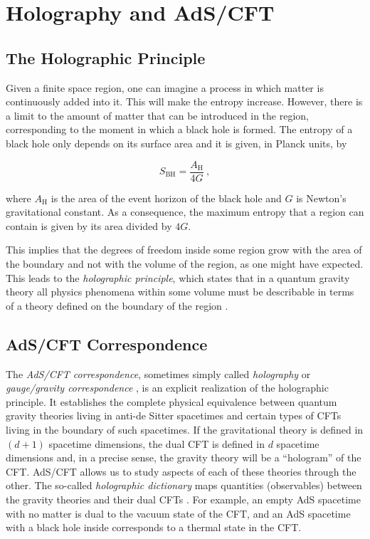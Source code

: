 \documentclass[twocolumn]{revtex4-2}
\providecommand{\eq}[2]{
    \begin{equation}
        #2
    \label{eq:#1}
    \end{equation}
}
\begin{document}
\section{Holography and AdS/CFT} \label{s:Holo_AdS/CFT}


\subsection{The Holographic Principle} \label{ss:Holography}

Given a finite space region, one can imagine a process in which matter is continuously added into it. This will make the entropy increase. However, there is a limit to the amount of matter that can be introduced in the region, corresponding to the moment in which a black hole is formed. The entropy of a black hole only depends on its surface area and it is given, in Planck units, by \cite{bekenstein_black_1973, hawking_particle_1975}
\eq{BH}{
    S_\text{BH} = \frac{ A_\text{H} }{ 4 G } \ ,
}
where $A_\text{H}$ is the area of the event horizon of the black hole and $G$ is Newton's gravitational constant. As a consequence, the maximum entropy that a region can contain is given by its area divided by $4G$.

This implies that the degrees of freedom inside some region grow with the area of the boundary and not with the volume of the region, as one might have expected. This leads to the \emph{holographic principle}, which states that in a quantum gravity theory all physics phenomena within some volume must be describable in terms of a theory defined on the boundary of the region \cite{t_hooft_dimensional_2009}.


\subsection{AdS/CFT Correspondence} \label{ss:AdS/CFT}

The \emph{AdS/CFT correspondence}, sometimes simply called \emph{holography} or \emph{gauge/gravity correspondence} \cite{maldacena_large_1999}, is an explicit realization of the holographic principle. It establishes the complete physical equivalence between quantum gravity theories living in anti-de Sitter spacetimes and certain types of CFTs living in the boundary of such spacetimes. If the gravitational theory is defined in $(d+1)$ spacetime dimensions, the dual CFT is defined in $d$ spacetime dimensions and, in a precise sense, the gravity theory will be a ``hologram'' of the CFT. AdS/CFT allows us to study aspects of each of these theories through the other. The so-called \emph{holographic dictionary} maps quantities (observables) between the gravity theories and their dual CFTs \cite{witten_anti_1998}. For example, an empty AdS spacetime with no matter is dual to the vacuum state of the CFT, and an AdS spacetime with a black hole inside corresponds to a thermal state in the CFT.
\end{document}
